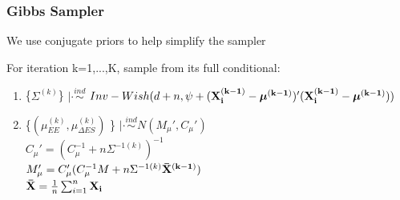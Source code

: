 \documentclass[handout]{beamer}\usepackage[]{graphicx}\usepackage[]{color}
\begin{document}
\begin{frame}
\frametitle{Gibbs Sampler}
We use conjugate priors to help simplify the sampler \\

\vspace{0.3cm}

For iteration k=1,...,K, sample from its full conditional:

\begin{enumerate}
% 
% 
% 




\item
 \{$\Sigma^{(k)}$\} $|\cdot \overset{ind}{\sim}$ $Inv-Wish(d+n,\psi+({\bf X_{i}^{(k-1)} - \boldsymbol{\mu}^{(k-1)}})'({\bf X_{i}^{(k-1)} - \boldsymbol{\mu}^{(k-1)}}))$ \\




\item
  \{$(\mu_{EE}^{(k)},\mu_{\Delta ES}^{(k)})$ \} $|\cdot \overset{ind}{\sim} N(M_{\mu}',C_{\mu}')$ \\
$C_{\mu}' = (C_{\mu}^{-1} + n \Sigma^{-1(k)})^{-1}$ \\
$M_{\mu}' = C_{\mu}'(C_{\mu}^{-1}M + n \Sigma^{-1(k)} {\bf \bar{X}^{(k-1)}})$ \\
${\bf \bar{X}} = \frac{1}{n}\sum_{i=1}^{n} {\bf X_{i}}$ \\


\end{enumerate}
\end{frame}
\end{document}
